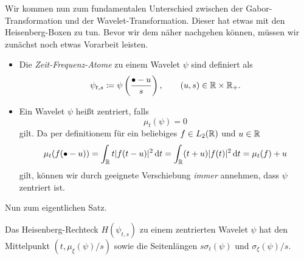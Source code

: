 Wir kommen nun zum fundamentalen Unterschied zwischen der Gabor-Transformation und der 
Wavelet-Transformation. Dieser hat etwas mit den Heisenberg-Boxen zu tun. Bevor wir dem näher
nachgehen können, müssen wir zunächst noch etwas Vorarbeit leisten.

\begin{definition} \leavevmode
\begin{itemize}
\item Die \emph{Zeit-Frequenz-Atome} zu einem Wavelet $ \psi $ sind definiert als
  \[
    \psi_{t,s} \coloneqq \psi\left(\frac{\bullet - u}{s}\right), \qquad (u,s) \in \mathbb{R} \times \mathbb{R}_{+}.
  \]
\item Ein Wavelet $ \psi $ heißt zentriert, falls
  \[
    \mu_{t}(\psi) = 0
  \]
  gilt. Da per definitionem für ein beliebiges $ f \in L_{2}(\mathbb{R}) $ und $ u \in \mathbb{R} $
  \[
      \mu_{t}(f(\bullet - u))
    = \int_{\R} t |f(t - u)|^{2} \dif t
    = \int_{\R} (t + u) |f(t)|^{2} \dif t
    = \mu_{t}(f) + u
  \]
  gilt, können wir durch geeignete Verschiebung \emph{immer} annehmen, dass $ \psi $ zentriert ist.
\end{itemize}
\end{definition}

Nun zum eigentlichen Satz.

\begin{proposition}
Das Heisenberg-Rechteck $ H(\psi_{t,s}) $ zu einem zentrierten Wavelet $ \psi $ hat den
Mittelpunkt $ (t, \mu_{\xi}(\psi) / s) $ sowie die Seitenlängen $ s \sigma_{t}(\psi) $ und
$ \sigma_{\xi}(\psi) / s $.
\end{proposition}


